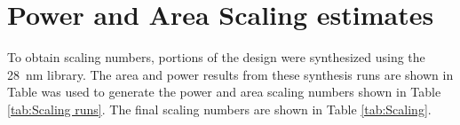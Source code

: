 \section{Power and Area Scaling estimates}
\label{sec:Power and Area Scaling estimates}

To obtain scaling numbers, portions of the design were synthesized using the \SI{28}{\nano\meter} library.
The area and power results from these synthesis runs are shown in Table was used to generate the power and area scaling numbers shown in Table \ref{tab:Scaling runs}.
The final scaling numbers are shown in Table \ref{tab:Scaling}.

\begin{table}[h]
  \centering
  \captionsetup{justification=centering}


\end{table}
